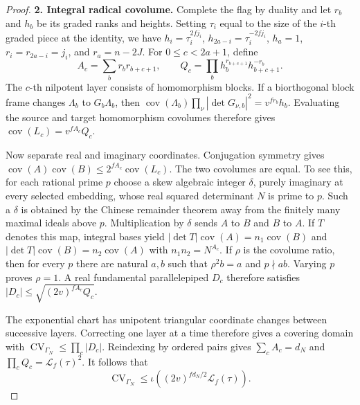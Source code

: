 \begin{proof}[Proof]
\textbf{2. Integral radical covolume.} Complete the flag by duality and
let $r_b$ and $h_b$ be its graded ranks and heights. Setting
$\tau_i$ equal to the size of the $i$-th graded piece at the identity,
we have $h_i=\tau_i^{2fj_i}$, $h_{2a-i}=\tau_i^{-2fj_i}$, $h_a=1$,
$r_i=r_{2a-i}=j_i$, and $r_a=n-2J$. For $0\le c<2a+1$, define
\[
 A_c=\sum_br_br_{b+c+1},\qquad
 Q_c=\prod_bh_b^{r_{b+c+1}}h_{b+c+1}^{-r_b}.
\]
The $c$-th nilpotent layer consists of homomorphism blocks. If a
biorthogonal block frame changes $\Lambda_b$ to $G_b\Lambda_b$, then
$\operatorname{cov}(\Lambda_b)\prod_\nu|\det G_{\nu,b}|^2
 =v^{fr_b}h_b$. Evaluating the source and target homomorphism
covolumes therefore gives $\operatorname{cov}(L_c)=v^{fA_c}Q_c$.

Now separate real and imaginary coordinates. Conjugation symmetry gives
$\operatorname{cov}(A)\operatorname{cov}(B)
 \le2^{fA_c}\operatorname{cov}(L_c)$. The two covolumes are equal. To
see this, for each rational prime $p$ choose a skew algebraic integer
$\delta$, purely imaginary at every selected embedding, whose real
squared determinant $N$ is prime to $p$. Such a $\delta$ is obtained by
the Chinese remainder theorem away from the finitely many maximal
ideals above $p$. Multiplication by $\delta$ sends $A$ to $B$ and $B$
to $A$. If $T$ denotes this map, integral bases yield
$|\det T|\operatorname{cov}(A)=n_1\operatorname{cov}(B)$ and
$|\det T|\operatorname{cov}(B)=n_2\operatorname{cov}(A)$ with
$n_1n_2=N^{A_c}$. If $\rho$ is the covolume ratio, then for every $p$
there are natural $a,b$ such that $\rho^2b=a$ and $p\nmid ab$. Varying
$p$ proves $\rho=1$. A real fundamental parallelepiped $D_c$ therefore
satisfies $|D_c|\le\sqrt{(2v)^{fA_c}Q_c}$.

The exponential chart has unipotent triangular coordinate changes
between successive layers. Correcting one layer at a time therefore
gives a covering domain with
$\operatorname{CV}_{\Gamma_N}\le\prod_c|D_c|$. Reindexing by ordered
pairs gives $\sum_cA_c=d_N$ and $\prod_cQ_c=\mathcal L_f(\tau)^2$.
It follows that
\begin{equation}\label{eq:radical-covolume}
 \operatorname{CV}_{\Gamma_N}
 \le\iota\!\left((2v)^{fd_N/2}\mathcal L_f(\tau)\right).
\end{equation}


\end{proof}
